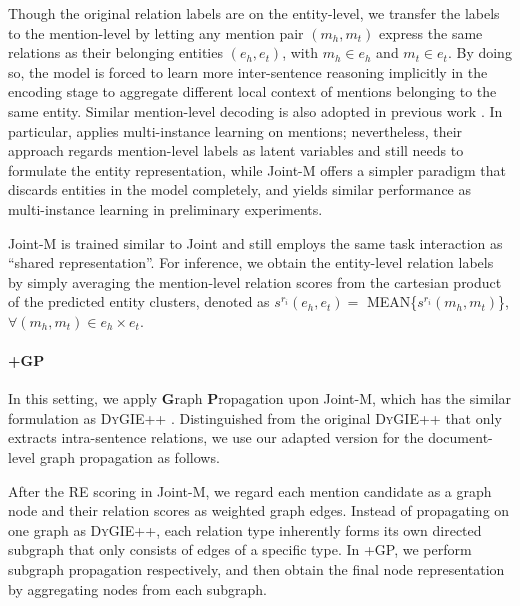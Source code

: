 \documentclass[11pt]{article}
\begin{document}
Though the original relation labels are on the entity-level, we transfer the labels to the mention-level by letting any mention pair $(m_h, m_t)$ express the same relations as their belonging entities $(e_h, e_t)$, with $m_h \in e_h$ and $m_t \in e_t$.
By doing so, the model is forced to learn more inter-sentence reasoning implicitly in the encoding stage to aggregate different local context of mentions belonging to the same entity.
Similar mention-level decoding is also adopted in previous work \cite{dwie,joint-mil}. In particular, \citet{joint-mil} applies multi-instance learning on mentions; nevertheless, their approach regards mention-level labels as latent variables and still needs to formulate the entity representation, while Joint-M offers a simpler paradigm that discards entities in the model completely, and yields similar performance as multi-instance learning in preliminary experiments.

Joint-M is trained similar to Joint and still employs the same task interaction as ``shared representation''.
For inference, we obtain the entity-level relation labels by simply averaging the mention-level relation scores from the cartesian product of the predicted entity clusters, denoted as $s^{r_i}(e_h, e_t)=$ MEAN\{$s^{r_i}(m_h, m_t)$\}, $\forall (m_h, m_t) \in e_h \times e_t$.

\paragraph{+GP}
In this setting, we apply \textbf{G}raph \textbf{P}ropagation upon Joint-M, which has the similar formulation as D\textsc{y}GIE++ \citep{dygie++}. Distinguished from the original D\textsc{y}GIE++ that only extracts intra-sentence relations, we use our adapted version for the document-level graph propagation as follows.

After the RE scoring in Joint-M, we regard each mention candidate as a graph node and their relation scores as weighted graph edges. Instead of propagating on one graph as D\textsc{y}GIE++, each relation type inherently forms its own directed subgraph that only consists of edges of a specific type. In +GP, we perform subgraph propagation respectively, and then obtain the final node representation by aggregating nodes from each subgraph.
\end{document}
